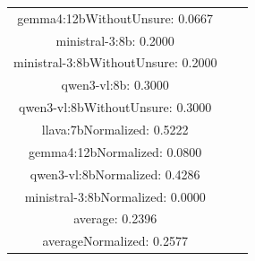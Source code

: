 \documentclass[a4paper]{article}
\begin{document}
\begin{tabular}{ccc}
gemma4:12bWithoutUnsure: 0.0667 \\ ministral-3:8b: 0.2000 \\ ministral-3:8bWithoutUnsure: 0.2000 \\ qwen3-vl:8b: 0.3000 \\ qwen3-vl:8bWithoutUnsure: 0.3000 \\ llava:7bNormalized: 0.5222 \\ gemma4:12bNormalized: 0.0800 \\ qwen3-vl:8bNormalized: 0.4286 \\ ministral-3:8bNormalized: 0.0000 \\ average: 0.2396 \\ averageNormalized: 0.2577 \end{minipage}\\
\end{tabular}

\vspace{5mm}
\end{document}
